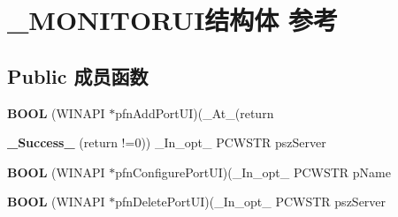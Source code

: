 \hypertarget{struct___m_o_n_i_t_o_r_u_i}{}\section{\+\_\+\+M\+O\+N\+I\+T\+O\+R\+U\+I结构体 参考}
\label{struct___m_o_n_i_t_o_r_u_i}
\subsection*{Public 成员函数}
\begin{DoxyCompactItemize}
\item 
\mbox{\label{struct___m_o_n_i_t_o_r_u_i_a47d5dd006ffc1712321fd96bb1f8567d}} 
{\bfseries B\+O\+OL} (W\+I\+N\+A\+PI $\ast$pfn\+Add\+Port\+UI)(\+\_\+\+At\+\_\+(return
\item 
\mbox{\label{struct___m_o_n_i_t_o_r_u_i_a6b26956dc23a11de4985b2c7d54f136c}} 
{\bfseries \+\_\+\+Success\+\_\+} (return !=0)) \+\_\+\+In\+\_\+opt\+\_\+ P\+C\+W\+S\+TR psz\+Server
\item 
\mbox{\label{struct___m_o_n_i_t_o_r_u_i_abc9887ca3f2de68c95c2a4faeb2032c2}} 
{\bfseries B\+O\+OL} (W\+I\+N\+A\+PI $\ast$pfn\+Configure\+Port\+UI)(\+\_\+\+In\+\_\+opt\+\_\+ P\+C\+W\+S\+TR p\+Name
\item 
\mbox{\label{struct___m_o_n_i_t_o_r_u_i_a71a0ce620239f4fb0f8d4ee7839db8b6}} 
{\bfseries B\+O\+OL} (W\+I\+N\+A\+PI $\ast$pfn\+Delete\+Port\+UI)(\+\_\+\+In\+\_\+opt\+\_\+ P\+C\+W\+S\+TR psz\+Server
\end{DoxyCompactItemize}
